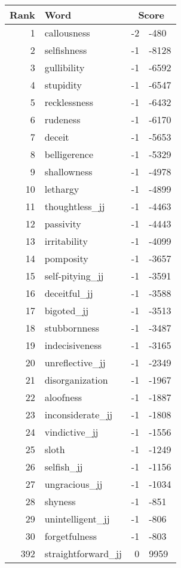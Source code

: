 \begin{longtable}[!htbp]{| rlr@{.}l |}
    \hline
    \textbf{Rank} & \textbf{Word} & \multicolumn{2}{c|}{\textbf{Score}} \\
    \hline
    \endhead
    1 & callousness & -2 & -480 \\
    2 & selfishness & -1 & -8128 \\
    3 & gullibility & -1 & -6592 \\
    4 & stupidity & -1 & -6547 \\
    5 & recklessness & -1 & -6432 \\
    6 & rudeness & -1 & -6170 \\
    7 & deceit & -1 & -5653 \\
    8 & belligerence & -1 & -5329 \\
    9 & shallowness & -1 & -4978 \\
    10 & lethargy & -1 & -4899 \\
    11 & thoughtless\_jj & -1 & -4463 \\
    12 & passivity & -1 & -4443 \\
    13 & irritability & -1 & -4099 \\
    14 & pomposity & -1 & -3657 \\
    15 & self-pitying\_jj & -1 & -3591 \\
    16 & deceitful\_jj & -1 & -3588 \\
    17 & bigoted\_jj & -1 & -3513 \\
    18 & stubbornness & -1 & -3487 \\
    19 & indecisiveness & -1 & -3165 \\
    20 & unreflective\_jj & -1 & -2349 \\
    21 & disorganization & -1 & -1967 \\
    22 & aloofness & -1 & -1887 \\
    23 & inconsiderate\_jj & -1 & -1808 \\
    24 & vindictive\_jj & -1 & -1556 \\
    25 & sloth & -1 & -1249 \\
    26 & selfish\_jj & -1 & -1156 \\
    27 & ungracious\_jj & -1 & -1034 \\
    28 & shyness & -1 & -851 \\
    29 & unintelligent\_jj & -1 & -806 \\
    30 & forgetfulness & -1 & -803 \\
    392 & straightforward\_jj & 0 & 9959 \\

\end{longtable}
